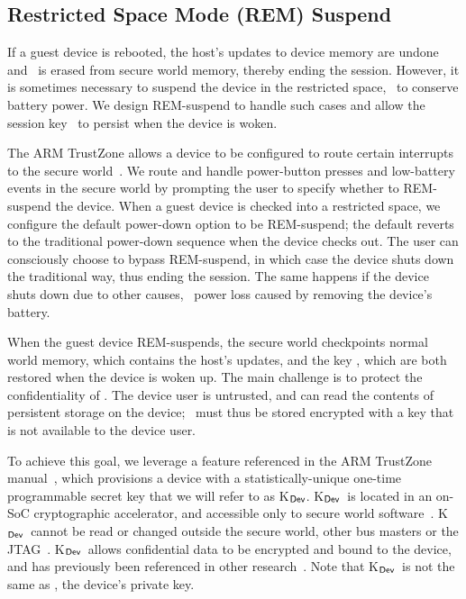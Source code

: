 \subsection{Restricted Space Mode (REM) Suspend}
\label{section:mechanism:REMsuspend}

\newcommand{\kdev}{{\sf K$_{\sf Dev}$}}
%
If a guest device is rebooted, the host's updates to device memory are undone
and \ks\ is erased from secure world memory, thereby ending the session.
However, it is sometimes necessary to suspend the device in the restricted
space, \eg~to conserve battery power. We design REM-suspend to handle such
cases and allow the session key \ks\ to persist when the device is woken.

The ARM TrustZone allows a device to be configured to route certain interrupts
to the secure world~\cite{armtz}. We route and handle power-button presses and
low-battery events in the secure world by prompting the user to specify whether
to REM-suspend the device. When a guest device is checked into a restricted
space, we configure the default power-down option to be REM-suspend; the
default reverts to the traditional power-down sequence when the device checks
out. The user can consciously choose to bypass REM-suspend, in which case the
device shuts down the traditional way, thus ending the session. The same
happens if the device shuts down due to other causes, \eg~power loss caused by
removing the device's battery. 

When the guest device REM-suspends, the secure world checkpoints normal world
memory, which contains the host's updates, and the key \ks, which are both
restored when the device is woken up. The main challenge is to protect the
confidentiality of \ks. The device user is untrusted, and can read the contents
of persistent storage on the device; \ks\ must thus be stored encrypted with a
key that is not available to the device user.

To achieve this goal, we leverage a feature referenced in the ARM TrustZone
manual~\cite[\S6.3.1]{armtz}, which provisions a device with a
statistically-unique one-time programmable secret key that we will refer to as
\kdev. \kdev\ is located in an on-SoC cryptographic accelerator, and accessible
only to secure world software~\cite[\S6.3.1]{armtz}. \kdev\ cannot be read or
changed outside the secure world, other bus masters or the JTAG~\cite{jtag}.
\kdev\ allows confidential data to be encrypted and bound to the device, and
has previously been referenced in other
research~\cite{tlr:asplos14,sentry:asplos15,ftpm:msrtr,mobiletrustedcomputing:ieee14}.
Note that \kdev\ is not the same as , the device's private key.

